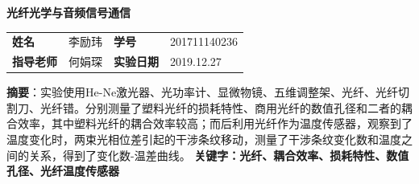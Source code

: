 \documentclass[UTF8]{ctexart}
\begin{document}
\begin{center}
\Huge\textbf{光纤光学与音频信号通信}
\renewcommand{\baselinestretch}{5.0}
\end{center}
\begin{center}
\small
\begin{tabular}{llll}
\textbf{姓名}&李励玮     &\textbf{学号}  &201711140236\\
\textbf{指导老师}&何娟琛 &\textbf{实验日期}& 2019.12.27\\
\end{tabular}
\end{center}

\small
\noindent\textbf{摘要}：实验使用He-Ne激光器、光功率计、显微物镜、五维调整架、光纤、光纤切割刀、光纤错。分别测量了塑料光纤的损耗特性、商用光纤的数值孔径和二者的耦合效率，其中塑料光纤的耦合效率较高；而后利用光纤作为温度传感器，观察到了温度变化时，两束光相位差引起的干涉条纹移动，测量了干涉条纹变化数和温度之间的关系，得到了变化数-温差曲线。
\newline\textbf{关键字：光纤、耦合效率、损耗特性、数值孔径、光纤温度传感器}
\end{document}
